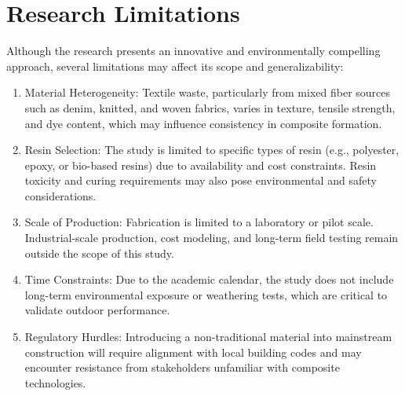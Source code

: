 \section{Research Limitations }
Although the research presents an innovative and environmentally compelling approach, several limitations may affect its scope and generalizability: 

\begin{enumerate}
\item Material Heterogeneity: Textile waste, particularly from mixed fiber sources such as denim, knitted, and woven fabrics, varies in texture, tensile strength, and dye content, which may influence consistency in composite formation. 

\item Resin Selection: The study is limited to specific types of resin (e.g., polyester, epoxy, or bio-based resins) due to availability and cost constraints. Resin toxicity and curing requirements may also pose environmental and safety considerations. 

\item Scale of Production: Fabrication is limited to a laboratory or pilot scale. Industrial-scale production, cost modeling, and long-term field testing remain outside the scope of this study. 

\item Time Constraints: Due to the academic calendar, the study does not include long-term environmental exposure or weathering tests, which are critical to validate outdoor performance. 

\item Regulatory Hurdles: Introducing a non-traditional material into mainstream construction will require alignment with local building codes and may encounter resistance from stakeholders unfamiliar with composite technologies. 
\end{enumerate}